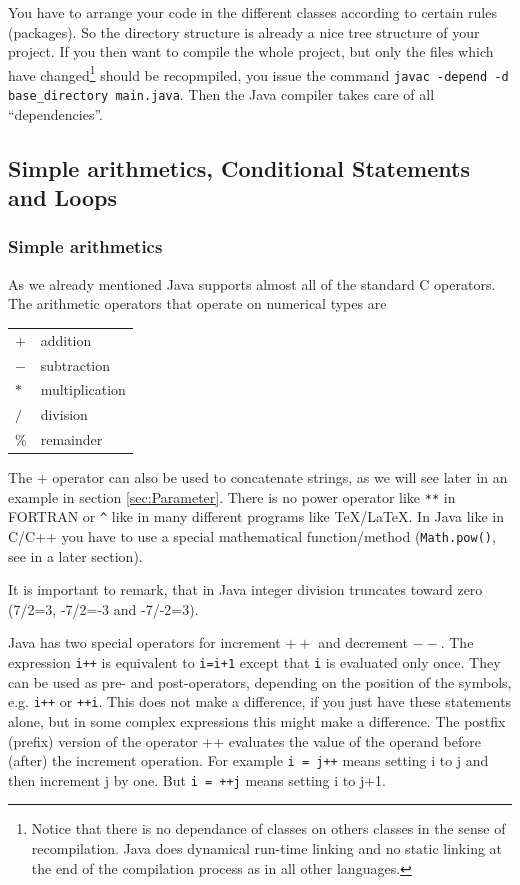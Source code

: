 You have to arrange your code in the different classes according to 
certain rules (packages). So the directory structure is already a
nice tree structure of your project. If you then want to compile
the whole project, but only the files which have changed\footnote{Notice
that there is no dependance of classes on others classes in the
sense of recompilation. Java does dynamical run-time linking and no static 
linking at the end of the compilation process as in all other languages.}
should be recopmpiled, you issue the
command \verb|javac -depend -d base_directory main.java|. Then
the Java compiler takes care of all ``dependencies''.   

\subsection{Simple arithmetics, Conditional Statements and Loops}
\label{sec:Loops}

\subsubsection{Simple arithmetics}
As we already mentioned Java  supports almost all of the standard
C operators. The arithmetic operators that operate on numerical types
are 
\begin{center}
\begin{tabular}{ll}
$+$ & addition \\
$-$ & subtraction                 \\
$*$ & multiplication \\
$/$ & division \\
\% & remainder
\end{tabular}
\end{center}
The $+$ operator can also be used to concatenate strings, as we will
see later in an example in section \ref{sec:Parameter}.
There is no power operator like \verb|**| in FORTRAN or \verb|^| like in many
different programs like TeX/LaTeX. In Java like in C/C++ you have to use
a special mathematical function/method 
(\verb|Math.pow()|, see in a later section).

It is important to remark, that in Java integer division truncates
toward zero (7/2=3, -7/2=-3 and -7/-2=3).

Java has two special operators for increment $++$ and decrement $--$. The 
expression \verb|i++| is equivalent to \verb|i=i+1| except that
\verb|i| is evaluated only once. They can be used as pre- and post-operators,
depending on the position of the symbols, e.g. \verb|i++| or \verb|++i|.
This does not make a difference, if you just have these statements
alone, but in some complex expressions this might make a difference.
The postfix (prefix) version of the operator ++ evaluates  the value
of the operand before (after) the increment operation.
For example \verb|i = j++| means setting i to j and then increment j by one.
But \verb|i = ++j| means setting i to j+1.

